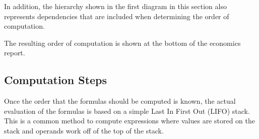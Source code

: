 In addition, the hierarchy shown in the first diagram in this section also represents dependencies that are included when determining the order of computation.

The resulting order of computation is shown at the bottom of the economics report.

\subsection{Computation Steps}\label{computation-steps}

Once the order that the formulas should be computed is known, the actual evaluation of the formulas is based on a simple Last In First Out (LIFO) stack.~ This is a common method to compute expressions where values are stored on the stack and operands work off of the top of the stack.
